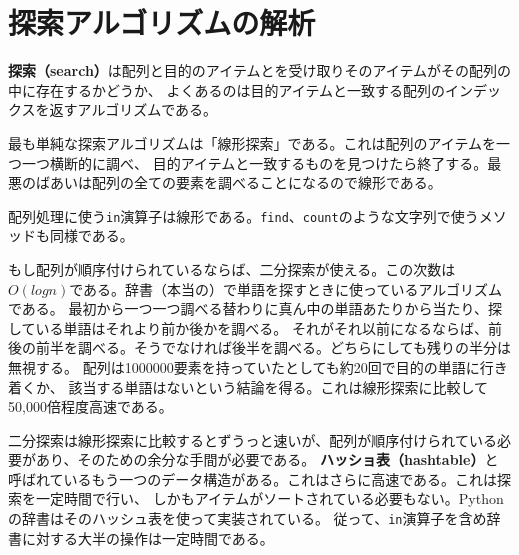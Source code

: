 \documentclass[a4j,12pt,makeidx]{jbook}
\begin{document}
\section{探索アルゴリズムの解析}
{\bf 探索（search）}は配列と目的のアイテムとを受け取りそのアイテムがその配列の中に存在するかどうか、
よくあるのは目的アイテムと一致する配列のインデックスを返すアルゴリズムである。\par
最も単純な探索アルゴリズムは「線形探索」である。これは配列のアイテムを一つ一つ横断的に調べ、
目的アイテムと一致するものを見つけたら終了する。最悪のばあいは配列の全ての要素を調べることになるので線形である。\par
配列処理に使う{\tt in}演算子は線形である。{\tt find}、{\tt count}のような文字列で使うメソッドも同様である。\par
もし配列が順序付けられているならば、二分探索が使える。この次数は$O(logn)$である。辞書（本当の）で単語を探すときに使っているアルゴリズムである。
最初から一つ一つ調べる替わりに真ん中の単語あたりから当たり、探している単語はそれより前か後かを調べる。
それがそれ以前になるならば、前後の前半を調べる。そうでなければ後半を調べる。どちらにしても残りの半分は無視する。
配列は1000000要素を持っていたとしても約20回で目的の単語に行き着くか、
該当する単語はないという結論を得る。これは線形探索に比較して50,000倍程度高速である。\par
二分探索は線形探索に比較するとずうっと速いが、配列が順序付けられている必要があり、そのための余分な手間が必要である。
{\bf ハッショ表（hashtable）}と呼ばれているもう一つのデータ構造がある。これはさらに高速である。これは探索を一定時間で行い、
しかもアイテムがソートされている必要もない。Pythonの辞書はそのハッシュ表を使って実装されている。
従って、{\tt in}演算子を含め辞書に対する大半の操作は一定時間である。
%
\end{document}
